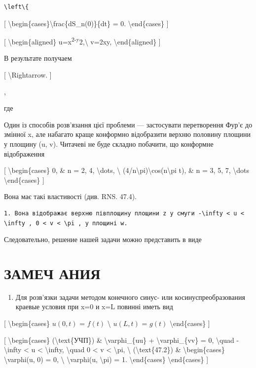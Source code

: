 \documentclass[
]{article}
\providecommand{\tightlist}{%
  \setlength{\itemsep}{0pt}\setlength{\parskip}{0pt}}
\begin{document}
{{\begin{verbatim}
\left\{
\end{verbatim}

{[} \textbackslash begin\{cases\}\textbackslash frac\{dS\_n(0)\}\{dt\} =
0. \textbackslash end\{cases\} {]}

{[} \textbackslash begin\{aligned\}
u=x\textsuperscript{2-y}2,\textbackslash{} v=2xy,
\textbackslash end\{aligned\} {]}

В результате получаем

{[} \textbackslash Rightarrow. {]}

,

где

Один із способів розв'язання цієї проблеми --- застосувати перетворення
Фур'є до змінної x, але набагато краще конформно відобразити верхню
половину площини у площину (u, v). Читачеві не буде складно побачити, що
конформне відображення

{[} \textbackslash begin\{cases\} 0, \& n = 2, 4, \textbackslash dots,
\textbackslash{}
(4/n\textbackslash pi)\textbackslash cos(n\textbackslash pi t), \& n =
3, 5, 7, \textbackslash dots \textbackslash end\{cases\} {]}

Вона має такі властивості (див. RNS. 47.4).

\begin{verbatim}
1. Вона відображає верхню півплощину площини z у смуги -\infty < u < \infty , 0 < v < \pi , у площині w.
\end{verbatim}

Следовательно, решение нашей задачи можно представить в виде

\section{ЗАМЕЧ
АНИЯ}\label{ux437ux430ux43cux435ux447-ux430ux43dux438ux44f}

\begin{enumerate}
\def\labelenumi{\arabic{enumi}.}
\tightlist
\item
  Для розв'язки задачи методом конечного синус- или
  косинуспреобразования краевые условия при x=0 и x=L повинні иметь вид
\end{enumerate}

{[} \textbackslash begin\{cases\} \(u(0, t)\) = \(f(t)\)
\textbackslash{} \(u(L, t)\) = \(g(t)\) \textbackslash end\{cases\} {]}

{[} \textbackslash begin\{cases\} (\textbackslash text\{УЧП\}) \&
\textbackslash varphi\_\{uu\} + \textbackslash varphi\_\{vv\} = 0,
\textbackslash quad -\textbackslash infty \textless{} u \textless{}
\textbackslash infty, \textbackslash quad 0 \textless{} v \textless{}
\textbackslash pi, \textbackslash{} (\textbackslash text\{47.2\}) \&
\textbackslash begin\{cases\} \textbackslash varphi(u, 0) = 0,
\textbackslash{} \textbackslash varphi(u, \textbackslash pi) = 1.
\textbackslash end\{cases\} \textbackslash end\{cases\} {]}

}}
\end{document}
